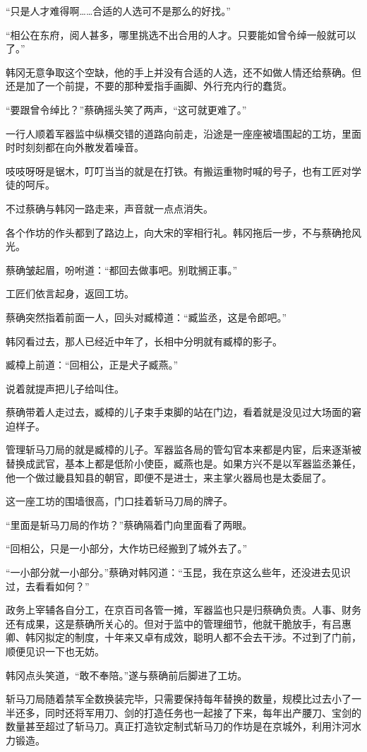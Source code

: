 “只是人才难得啊……合适的人选可不是那么的好找。”

“相公在东府，阅人甚多，哪里挑选不出合用的人才。只要能如曾令绰一般就可以了。”

韩冈无意争取这个空缺，他的手上并没有合适的人选，还不如做人情还给蔡确。但还是加了一个前提，不要的那种爱指手画脚、外行充内行的蠢货。

“要跟曾令绰比？”蔡确摇头笑了两声，“这可就更难了。”

一行人顺着军器监中纵横交错的道路向前走，沿途是一座座被墙围起的工坊，里面时时刻刻都在向外散发着噪音。

吱吱呀呀是锯木，叮叮当当的就是在打铁。有搬运重物时喊的号子，也有工匠对学徒的呵斥。

不过蔡确与韩冈一路走来，声音就一点点消失。

各个作坊的作头都到了路边上，向大宋的宰相行礼。韩冈拖后一步，不与蔡确抢风光。

蔡确皱起眉，吩咐道：“都回去做事吧。别耽搁正事。”

工匠们依言起身，返回工坊。

蔡确突然指着前面一人，回头对臧樟道：“臧监丞，这是令郎吧。”

韩冈看过去，那人已经近中年了，长相中分明就有臧樟的影子。

臧樟上前道：“回相公，正是犬子臧燕。”

说着就提声把儿子给叫住。

蔡确带着人走过去，臧樟的儿子束手束脚的站在门边，看着就是没见过大场面的窘迫样子。

管理斩马刀局的就是臧樟的儿子。军器监各局的管勾官本来都是内宦，后来逐渐被替换成武官，基本上都是低阶小使臣，臧燕也是。如果方兴不是以军器监丞兼任，他一个做过畿县知县的朝官，即便不是进士，来主掌火器局也是太委屈了。

这一座工坊的围墙很高，门口挂着斩马刀局的牌子。

“里面是斩马刀局的作坊？”蔡确隔着门向里面看了两眼。

“回相公，只是一小部分，大作坊已经搬到了城外去了。”

“一小部分就一小部分。”蔡确对韩冈道：“玉昆，我在京这么些年，还没进去见识过，去看看如何？”

政务上宰辅各自分工，在京百司各管一摊，军器监也只是归蔡确负责。人事、财务还有成果，这是蔡确所关心的。但对于监中的管理细节，他就干脆放手，有吕惠卿、韩冈拟定的制度，十年来又卓有成效，聪明人都不会去干涉。不过到了门前，顺便见识一下也无妨。

韩冈点头笑道，“敢不奉陪。”遂与蔡确前后脚进了工坊。

斩马刀局随着禁军全数换装完毕，只需要保持每年替换的数量，规模比过去小了一半还多，同时还将军用刀、剑的打造任务也一起接了下来，每年出产腰刀、宝剑的数量甚至超过了斩马刀。真正打造钦定制式斩马刀的作坊是在京城外，利用汴河水力锻造。

